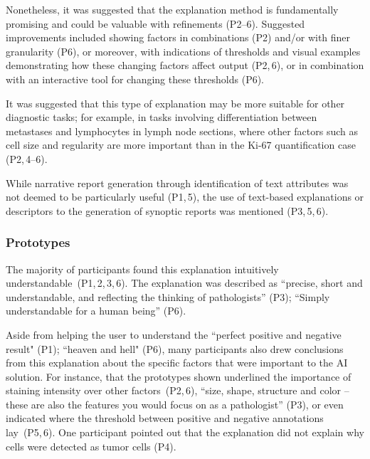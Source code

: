 \documentclass[final,5p,times,twocolumn,hyphens]{elsarticle}
\begin{document}
Nonetheless, it was suggested that the explanation method is fundamentally promising and could be valuable with refinements (P2--6). Suggested improvements included showing factors in combinations (P2) and/or with finer granularity (P6), or moreover, with indications of thresholds and visual examples demonstrating how these changing factors affect output (P2,\,6), or in combination with an interactive tool for changing these thresholds (P6). 

It was suggested that this type of explanation may be more suitable for other diagnostic tasks; for example, in tasks involving differentiation between metastases and lymphocytes in lymph node sections, where other factors such as cell size and regularity are more important than in the Ki-67 quantification case (P2,\,4--6).

While narrative report generation through identification of text attributes was not deemed to be particularly useful (P1,\,5), the use of text-based explanations or descriptors to the generation of synoptic reports was mentioned (P3,\,5,\,6). 

\subsubsection{Prototypes}

The majority of participants found this explanation intuitively understandable~(P1,\,2,\,3,\,6). The explanation was described as “precise, short and understandable, and reflecting the thinking of pathologists” (P3); “Simply understandable for a human being” (P6).


Aside from helping the user to understand the ``perfect positive and negative result" (P1); ``heaven and hell" (P6), many participants also drew conclusions from this explanation about the specific factors that were important to the AI solution. For instance, that the prototypes shown underlined the importance of staining intensity over other factors~(P2,\,6), ``size, shape, structure and color -- these are also the features you would focus on as a pathologist” (P3), or even indicated where the threshold between positive and negative annotations lay~(P5,\,6). One participant pointed out that the explanation did not explain why cells were detected as tumor cells (P4).
\end{document}

